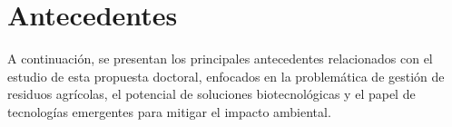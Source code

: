 \chapter{Antecedentes}

A continuación, se presentan los principales antecedentes relacionados con el estudio de esta propuesta doctoral, enfocados en la problemática de gestión de residuos agrícolas, el potencial de soluciones biotecnológicas y el papel de tecnologías emergentes para mitigar el impacto ambiental.






